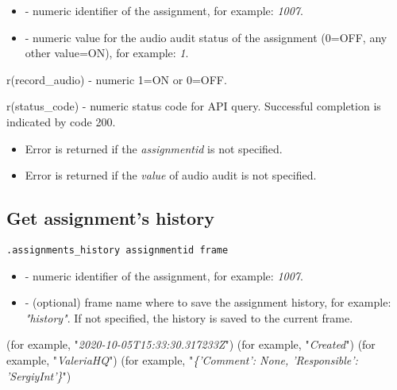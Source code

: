 \paramsheader
\begin{itemize}
    \item {} - numeric identifier of the assignment, for example: \textit{1007}.
    \item {} - numeric value for the audio audit status of the assignment (0=OFF, any other value=ON), for example: \textit{1}.

\end{itemize}

\savedres
\begin{compactitem}
    \item r(record\_audio) - numeric 1=ON or 0=OFF.
    \item r(status\_code)  - numeric status code for API query. Successful completion is indicated by code 200.
\end{compactitem}

\errheader
\begin{itemize}
    \item Error  is returned if the \textit{assignmentid} is not specified.
    \item Error  is returned if the \textit{value} of audio audit is not specified.
\end{itemize}

\subsection{Get assignment's history}

\begin{lstlisting}[style=CommandLineStyle]
.assignments_history assignmentid frame
\end{lstlisting}

\paramsheader
\begin{itemize}
    \item {} - numeric identifier of the assignment, for example: \textit{1007}.
    \item {} - (optional) frame name where to save the assignment history, for example: \textit{"history"}. If not specified, the history is saved to the current frame.

\end{itemize}


\begin{compactitem}
     (for example, "\textit{2020-10-05T15:33:30.317233Z}")
     (for example, "\textit{Created}")
     (for example, "\textit{ValeriaHQ}")
     (for example, "\textit{\{'Comment': None, 'Responsible': 'SergiyInt'\}}")
\end{compactitem}

